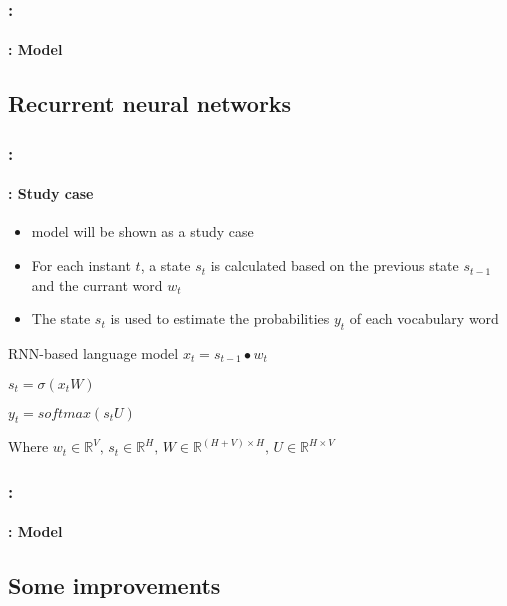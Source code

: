 \documentclass[xcolor=table]{beamer}
\begin{document}
\begin{frame}
	\frametitle{\insertshortsubtitle: \insertsection}
	\framesubtitle{\insertsubsection: Model}
	

\end{frame}

\subsection{Recurrent neural networks}

\begin{frame}
	\frametitle{\insertshortsubtitle: \insertsection}
	\framesubtitle{\insertsubsection: Study case}

	\begin{itemize}
		\item \cite{2010-mokolov-al} model will be shown as a study case
		\item For each instant $t$, a state $s_t$ is calculated based on the previous state $s_{t-1}$ and the currant word $w_t$
		\item The state $s_t$ is used to estimate the probabilities $y_t$ of each vocabulary word
	\end{itemize}
	
	\begin{block}{RNN-based language model}
		$x_t = s_{t-1} \bullet w_t$
		
		$s_t = \sigma(x_t W)$
		
		$y_t = softmax(s_t U)$
		
		Where $w_t \in \mathbb{R}^{V},\, s_t \in \mathbb{R}^{H},\, W \in \mathbb{R}^{(H+V)\times H},\, U \in \mathbb{R}^{H\times V}$
	\end{block}

\end{frame}

\begin{frame}
	\frametitle{\insertshortsubtitle: \insertsection}
	\framesubtitle{\insertsubsection: Model}

	\begin{center}
	\end{center}

\end{frame}

\subsection{Some improvements}
\end{document}
